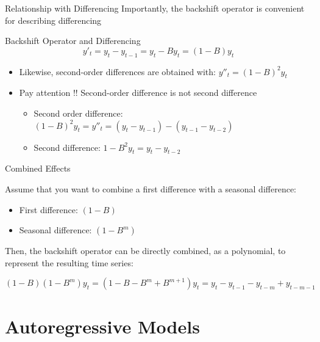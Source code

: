 \documentclass{beamer}
\begin{document}
\begin{frame}{Relationship with Differencing}
  Importantly, the backshift operator is convenient for describing differencing\\

  \medskip
  
  \begin{exampleblock}{Backshift Operator and Differencing}
    $$y'_t = y_t - y_{t-1} = y_t - By_t = (1-B)y_t$$
  \end{exampleblock}


  \begin{itemize}
    \item Likewise, second-order differences are obtained with: $y''_t = (1-B)^2y_t$  
    \item Pay attention !! Second-order difference is not second difference 
      \begin{itemize}
      \item Second order difference: $(1-B)^2 y_t = y''_t = (y_t - y_{t-1}) - (y_{t-1} - y_{t-2})$
      \item Second difference: $1-B^2 y_t = y_t - y_{t-2}$
      \end{itemize}
  \end{itemize}
  
\end{frame}


\begin{frame}{Combined Effects}

Assume that you want to combine a first difference with a seasonal difference:
  
  \begin{itemize}
  \item First difference: $(1-B)$
  \item Seasonal difference: $(1-B^m)$
  \end{itemize}

  Then, the backshift operator can be directly combined, as a polynomial, to represent the resulting time series:

  \begin{equation*}
    (1-B)(1-B^m)y_t = (1 - B - B^m + B^{m+1})y_t = y_t - y_{t-1} - y_{t-m} + y_{t-m-1}
  \end{equation*}    
\end{frame}


\section{Autoregressive Models}
\end{document}
